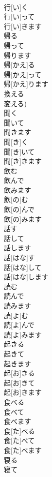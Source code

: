 \documentclass[8pt]{extreport}
\begin{document}
\begin{CJK}{UTF8}{min}
\\	行[い]く 
\\	行[い]って 
\\	行[い]きます	
\\	帰る 
\\	帰って 
\\	帰ります	
\\	帰[かえ]る 
\\	帰[かえ]って 
\\	帰[かえ]ります 
\\	換える 
\\	変える)	
\\	聞く 
\\	聞いて 
\\	聞きます	
\\	聞[き]く 
\\	聞[き]いて 
\\	聞[き]きます	
\\	飲む 
\\	飲んで 
\\	飲みます	
\\	飲[の]む 
\\	飲[の]んで 
\\	飲[の]みます	
\\	話す 
\\	話して 
\\	話します	
\\	話[はな]す 
\\	話[はな]して 
\\	話[はな]します	
\\	読む 
\\	読んで 
\\	読みます	
\\	読[よ]む 
\\	読[よ]んで 
\\	読[よ]みます	
\\	起きる 
\\	起きて 
\\	起きます	
\\	起[お]きる 
\\	起[お]きて 
\\	起[お]きます	
\\	食べる 
\\	食べて 
\\	食べます	
\\	食[た]べる 
\\	食[た]べて 
\\	食[た]べます	
\\	寝る 
\\	寝て 

\end{CJK}
\end{document}
